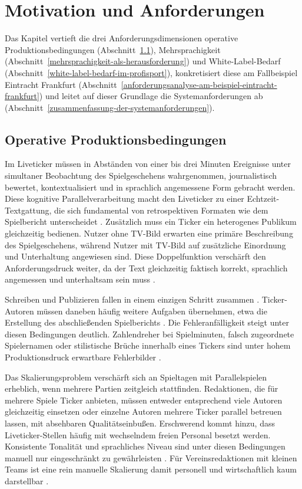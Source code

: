 \chapter{Motivation und Anforderungen}\label{motivation-und-anforderungen}

Das Kapitel vertieft die drei Anforderungsdimensionen operative Produktionsbedingungen (Abschnitt~\ref{redaktioneller-aufwand-bei-livetickern}), Mehrsprachigkeit (Abschnitt~\ref{mehrsprachigkeit-als-herausforderung}) und White-Label-Bedarf (Abschnitt~\ref{white-label-bedarf-im-profisport}), konkretisiert diese am Fallbeispiel Eintracht Frankfurt (Abschnitt~\ref{anforderungsanalyse-am-beispiel-eintracht-frankfurt}) und leitet auf dieser Grundlage die Systemanforderungen ab (Abschnitt~\ref{zusammenfassung-der-systemanforderungen}).

\section{Operative Produktionsbedingungen}\label{redaktioneller-aufwand-bei-livetickern}


Im Liveticker müssen in Abständen von einer bis drei Minuten Ereignisse unter simultaner Beobachtung des Spielgeschehens wahrgenommen, journalistisch bewertet, kontextualisiert und in sprachlich angemessene Form gebracht werden. Diese kognitive Parallelverarbeitung macht den Liveticker zu einer Echtzeit-Textgattung, die sich fundamental von retrospektiven Formaten wie dem Spielbericht unterscheidet \cite{hauser2008}. Zusätzlich muss ein Ticker ein heterogenes Publikum gleichzeitig bedienen. Nutzer ohne TV-Bild erwarten eine primäre Beschreibung des Spielgeschehens, während Nutzer mit TV-Bild auf zusätzliche Einordnung und Unterhaltung angewiesen sind. Diese Doppelfunktion verschärft den Anforderungsdruck weiter, da der Text gleichzeitig faktisch korrekt, sprachlich angemessen und unterhaltsam sein muss \cite{blum2023}.

Schreiben und Publizieren fallen in einem einzigen Schritt zusammen \cite{boelz2013}. Ticker-Autoren müssen daneben häufig weitere Aufgaben übernehmen, etwa die Erstellung des abschließenden Spielberichts \cite{blum2023}. Die Fehleranfälligkeit steigt unter diesen Bedingungen deutlich. Zahlendreher bei Spielminuten, falsch zugeordnete Spielernamen oder stilistische Brüche innerhalb eines Tickers sind unter hohem Produktionsdruck erwartbare Fehlerbilder \cite{blum2023, beils2023}.

Das Skalierungsproblem verschärft sich an Spieltagen mit Parallelspielen erheblich, wenn mehrere Partien zeitgleich stattfinden. Redaktionen, die für mehrere Spiele Ticker anbieten, müssen entweder entsprechend viele Autoren gleichzeitig einsetzen oder einzelne Autoren mehrere Ticker parallel betreuen lassen, mit absehbaren Qualitätseinbußen. Erschwerend kommt hinzu, dass Liveticker-Stellen häufig mit wechselndem freien Personal besetzt werden. Konsistente Tonalität und sprachliches Niveau sind unter diesen Bedingungen manuell nur eingeschränkt zu gewährleisten \cite{blum2023}. Für Vereinsredaktionen mit kleinen Teams ist eine rein manuelle Skalierung damit personell und wirtschaftlich kaum darstellbar \cite{beils2023}.




